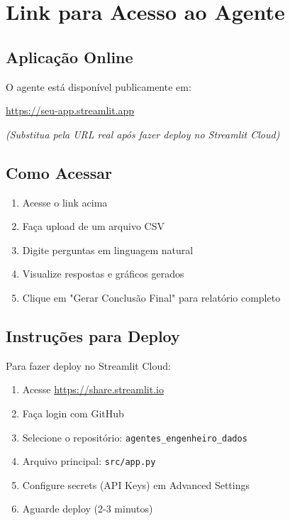 \documentclass[12pt,a4paper]{article}
\begin{document}
\newpage
\section{Link para Acesso ao Agente}

\subsection{Aplicação Online}

O agente está disponível publicamente em:

\begin{center}
\Large
\url{https://seu-app.streamlit.app}
\end{center}

\textit{(Substitua pela URL real após fazer deploy no Streamlit Cloud)}

\subsection{Como Acessar}

\begin{enumerate}
    \item Acesse o link acima
    \item Faça upload de um arquivo CSV
    \item Digite perguntas em linguagem natural
    \item Visualize respostas e gráficos gerados
    \item Clique em "Gerar Conclusão Final" para relatório completo
\end{enumerate}

\subsection{Instruções para Deploy}

Para fazer deploy no Streamlit Cloud:

\begin{enumerate}
    \item Acesse \url{https://share.streamlit.io}
    \item Faça login com GitHub
    \item Selecione o repositório: \texttt{agentes\_engenheiro\_dados}
    \item Arquivo principal: \texttt{src/app.py}
    \item Configure secrets (API Keys) em Advanced Settings
    \item Aguarde deploy (2-3 minutos)
\end{enumerate}
\end{document}
